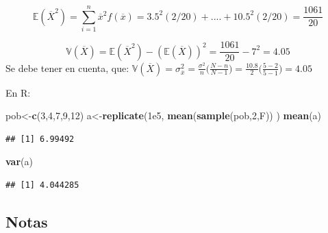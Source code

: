 \documentclass[
  ignorenonframetext,
]{beamer}
\newenvironment{Shaded}{\begin{snugshade}}{\end{snugshade}}
\newcommand{\DecValTok}[1]{\textcolor[rgb]{0.00,0.00,0.81}{#1}}
\newcommand{\FloatTok}[1]{\textcolor[rgb]{0.00,0.00,0.81}{#1}}
\newcommand{\KeywordTok}[1]{\textcolor[rgb]{0.13,0.29,0.53}{\textbf{#1}}}
\newcommand{\NormalTok}[1]{#1}
\begin{document}
\begin{frame}[fragile]{}

\[\mathbb{E}(\overline{X}^2)=\sum_{i=1}^{n} \overline{x}^2f(\overline{x})=3.5^2(2/20)+....+10.5^2(2/20)=\frac{1061}{20} \]

\[\mathbb{V}(\overline{X})= \mathbb{E}(\overline{X}^2)-(\mathbb{E}(\overline{X}))^2=\frac{1061}{20}-7^2 =4.05\]
Se debe tener en cuenta, que:
\(\displaystyle \mathbb{V}(\overline{X})=\sigma_{\overline{x}}^{2}=\frac{\sigma^2}{n}\Bigg(\frac{N-n}{N-1}\Bigg) =\frac{10.8}{2}\Bigg(\frac{5-2}{5-1}\Bigg)=4.05\)

En R:

\begin{Shaded}
\begin{Highlighting}[]
\NormalTok{pob<-}\KeywordTok{c}\NormalTok{(}\DecValTok{3}\NormalTok{,}\DecValTok{4}\NormalTok{,}\DecValTok{7}\NormalTok{,}\DecValTok{9}\NormalTok{,}\DecValTok{12}\NormalTok{)}
\NormalTok{a<-}\KeywordTok{replicate}\NormalTok{(}\FloatTok{1e5}\NormalTok{, }\KeywordTok{mean}\NormalTok{(}\KeywordTok{sample}\NormalTok{(pob,}\DecValTok{2}\NormalTok{,F)) )}
\KeywordTok{mean}\NormalTok{(a)}
\end{Highlighting}
\end{Shaded}

\begin{verbatim}
## [1] 6.99492
\end{verbatim}

\begin{Shaded}
\begin{Highlighting}[]
\KeywordTok{var}\NormalTok{(a)}
\end{Highlighting}
\end{Shaded}

\begin{verbatim}
## [1] 4.044285
\end{verbatim}

\end{frame}

\hypertarget{notas}{%
\subsection{Notas}\label{notas}}
\end{document}
